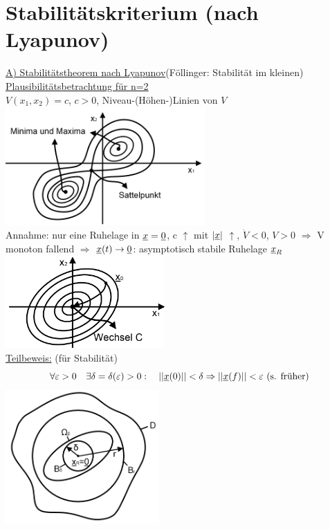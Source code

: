 \documentclass[openany,a4paper,11pt]{book}
\begin{document}
\section{Stabilitätskriterium (nach Lyapunov)}
\uline{A) Stabilitätstheorem nach Lyapunov}(Föllinger: Stabilität im kleinen) \\
\uline{Plausibilitätsbetrachtung für n=2}\\
$V(x_1,x_2)=c$,  $c>0$, Niveau-(Höhen-)Linien von $V$\\
\includegraphics[width=3in]{imgs/NLR36.png}\\
Annahme: nur eine Ruhelage in $\uline{x}=\uline{0}$, c $\uparrow$ mit $|\uline{x}|$ $\uparrow$, $\dot{V}<0$, $V>0$ $\Rightarrow$ V monoton fallend $\Rightarrow$ $\uline{x}(t)\rightarrow\uline{0}$: asymptotisch stabile Ruhelage $\uline{x}_R$\\
\includegraphics[width=2.4in]{imgs/NLR37.png}\\
\uline{Teilbeweis:} (für Stabilität)\\
\[\forall \varepsilon>0 \quad \exists \delta =\delta(\varepsilon)>0: \quad ||\uline{x}(0)||<\delta \Rightarrow ||\uline{x}(f)||<\varepsilon \text{ (s. früher)}\]
\includegraphics[width=2.3in]{imgs/NLR38.png}
\end{document}
